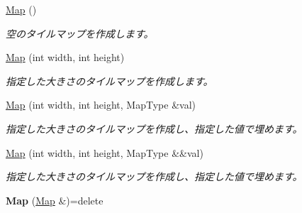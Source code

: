 \begin{DoxyCompactItemize}
\item 
\hyperlink{class_map_a1d025d39c20c7cffe9c85607965bff5c}{Map} ()
\begin{DoxyCompactList}\small\item\em 空のタイルマップを作成します。\end{DoxyCompactList}\item 
\hyperlink{class_map_a8fd7da75b5b4440e1c7df6e0c345ef10}{Map} (int width, int height)
\begin{DoxyCompactList}\small\item\em 指定した大きさのタイルマップを作成します。\end{DoxyCompactList}\item 
\hyperlink{class_map_a60d3d60f11ce569b7d11a1434a767a4c}{Map} (int width, int height, Map\+Type \&val)
\begin{DoxyCompactList}\small\item\em 指定した大きさのタイルマップを作成し、指定した値で埋めます。\end{DoxyCompactList}\item 
\hyperlink{class_map_aa4a58a3e9c58e2c9b1f56947f19670cb}{Map} (int width, int height, Map\+Type \&\&val)
\begin{DoxyCompactList}\small\item\em 指定した大きさのタイルマップを作成し、指定した値で埋めます。\end{DoxyCompactList}\item 
{\bfseries Map} (\hyperlink{class_map}{Map} \&)=delete\hypertarget{class_map_a1c79b2a29e17d9db7355b24946d15488}{}\label{class_map_a1c79b2a29e17d9db7355b24946d15488}


\end{DoxyCompactItemize}
